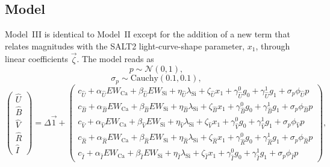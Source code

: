 \documentclass[trackchanges]{aastex62}   	%
\begin{document}
\subsection{Model}
\label{modelIImodel:sec}
Model~III is identical to Model~II except for the 
addition of a new term  that relates magnitudes with the SALT2 light-curve-shape parameter,
$x_1$, through linear coefficients $\vec{\zeta}$. 
The model reads as
\begin{equation}
p  \sim \mathcal{N}(0,1 ),
\end{equation}
\begin{equation}
\sigma_p  \sim \text{Cauchy}(0.1,0.1),
\end{equation}
\begin{equation}
\begin{pmatrix}
{\hat{U}}\\{\hat{B}}\\{\hat{V}}\\{\hat{R}}\\{\hat{I}}
\end{pmatrix}
=
\Delta  \vec{1} +
\begin{pmatrix}
c_{\hat{U}}+\alpha_{\hat{U}} EW_{\mathrm{Ca}} + \beta_{\hat{U}} EW_{\mathrm{Si}} + \eta_{\hat{U}} \lambda_{\mathrm{Si}} +\zeta_{\hat{U}} x_1 +\gamma^0_{{\hat{U}}} g_0 +\gamma^1_{{\hat{U}}} g_1 + \sigma_p\phi_{\hat{U}} p\\
c_{\hat{B}}+\alpha_{\hat{B}} EW_{\mathrm{Ca}} + \beta_{\hat{B}} EW_{\mathrm{Si}} + \eta_{\hat{B}} \lambda_{\mathrm{Si}} +\zeta_{\hat{B}} x_1 +\gamma^0_{{\hat{B}}} g_0 +\gamma^1_{{\hat{B}}} g_1 + \sigma_p\phi_{\hat{B}} p\\
c_{\hat{V}}+\alpha_{\hat{V}} EW_{\mathrm{Ca}} + \beta_{\hat{V}} EW_{\mathrm{Si}} + \eta_{\hat{V}} \lambda_{\mathrm{Si}} +\zeta_{\hat{V}} x_1+\gamma^0_{{\hat{V}}} g_0 +\gamma^1_{{\hat{V}}} g_1 + \sigma_p\phi_{\hat{V}}  p\\
c_{\hat{R}}+\alpha_{\hat{R}} EW_{\mathrm{Ca}} + \beta_{\hat{R}} EW_{\mathrm{Si}} + \eta_{\hat{R}} \lambda_{\mathrm{Si}} +\zeta_{\hat{R}} x_1+\gamma^0_{{\hat{R}}} g_0 +\gamma^1_{{\hat{R}}} g_1 + \sigma_p\phi_{\hat{R}} p\\
c_{\hat{I}}+\alpha_{\hat{I}} EW_{\mathrm{Ca}} + \beta_{\hat{I}} EW_{\mathrm{Si}}+ \eta_{\hat{I}} \lambda_{\mathrm{Si}}+\zeta_{\hat{I}} x_1+\gamma^0_{{\hat{I}}} g_0 +\gamma^1_{{\hat{I}}} g_1 + \sigma_p\phi_{\hat{I}}  p
\end{pmatrix},
\label{ewsiv3:eqn}
\end{equation}
\end{document}
